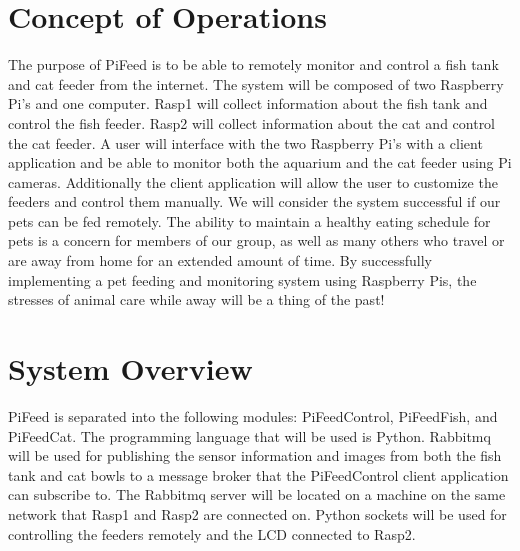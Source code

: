 




\usepackage[compact]{titlesec}





\section{Concept of Operations}
The purpose of PiFeed is to be able to remotely monitor and control a fish tank
and cat feeder from the internet. The system will be composed of two
Raspberry Pi's and one computer. Rasp1 will collect information about the fish
tank and control the fish feeder. Rasp2 will collect information about the cat
and control the cat feeder. A user will interface with the two Raspberry Pi's
with a client application and be able to monitor both the aquarium and the cat
feeder using Pi cameras. Additionally the client application will allow the user
to customize the feeders and control them manually. We will consider the system
successful if our pets can be fed remotely. The ability to maintain a healthy eating schedule for pets is a concern for members of our group, as well
as many others who travel or are away from home for an extended amount of time.
By successfully implementing a pet feeding and monitoring system using Raspberry
Pis, the stresses of animal care while away will be a thing of the past!

\section{System Overview}
PiFeed is separated into the following modules: PiFeedControl, PiFeedFish, and
PiFeedCat. The programming language that will be used is Python. Rabbitmq will
be used for publishing the sensor information and images from both the fish tank
and cat bowls to a message broker that the PiFeedControl client application can
subscribe to. The Rabbitmq server will be located on a machine on the same
network that Rasp1 and Rasp2 are connected on. Python sockets will be used for
controlling the feeders remotely and the LCD connected to Rasp2.

